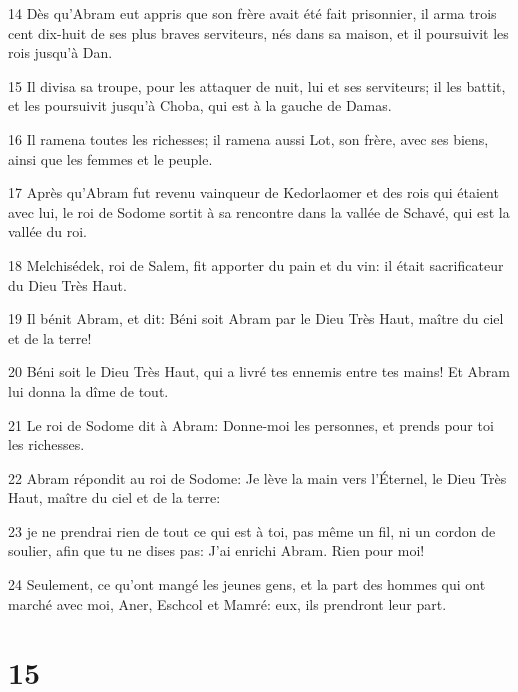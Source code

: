 \par 14 Dès qu'Abram eut appris que son frère avait été fait prisonnier, il arma trois cent dix-huit de ses plus braves serviteurs, nés dans sa maison, et il poursuivit les rois jusqu'à Dan.
\par 15 Il divisa sa troupe, pour les attaquer de nuit, lui et ses serviteurs; il les battit, et les poursuivit jusqu'à Choba, qui est à la gauche de Damas.
\par 16 Il ramena toutes les richesses; il ramena aussi Lot, son frère, avec ses biens, ainsi que les femmes et le peuple.
\par 17 Après qu'Abram fut revenu vainqueur de Kedorlaomer et des rois qui étaient avec lui, le roi de Sodome sortit à sa rencontre dans la vallée de Schavé, qui est la vallée du roi.
\par 18 Melchisédek, roi de Salem, fit apporter du pain et du vin: il était sacrificateur du Dieu Très Haut.
\par 19 Il bénit Abram, et dit: Béni soit Abram par le Dieu Très Haut, maître du ciel et de la terre!
\par 20 Béni soit le Dieu Très Haut, qui a livré tes ennemis entre tes mains! Et Abram lui donna la dîme de tout.
\par 21 Le roi de Sodome dit à Abram: Donne-moi les personnes, et prends pour toi les richesses.
\par 22 Abram répondit au roi de Sodome: Je lève la main vers l'Éternel, le Dieu Très Haut, maître du ciel et de la terre:
\par 23 je ne prendrai rien de tout ce qui est à toi, pas même un fil, ni un cordon de soulier, afin que tu ne dises pas: J'ai enrichi Abram. Rien pour moi!
\par 24 Seulement, ce qu'ont mangé les jeunes gens, et la part des hommes qui ont marché avec moi, Aner, Eschcol et Mamré: eux, ils prendront leur part.

\chapter{15}

